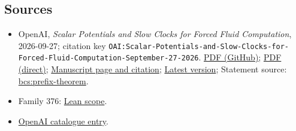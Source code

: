 \documentclass[11pt]{article}
\begin{document}
\subsection{Sources}
\begin{itemize}
\item OpenAI, \emph{Scalar Potentials and Slow Clocks for Forced Fluid Computation}, 2026-09-27; citation key \texttt{OAI:Scalar-Potentials-and-Slow-Clocks-for-Forced-Fluid-Computation-September-27-2026}. \href{https://github.com/openai/math/blob/adc7f1241b42e322a6451854ab7e4b4c146bf78a/preprints/Scalar-Potentials-and-Slow-Clocks-for-Forced-Fluid-Computation-September-27-2026/manuscript.pdf}{PDF (GitHub)}; \href{https://github.com/openai/math/raw/adc7f1241b42e322a6451854ab7e4b4c146bf78a/preprints/Scalar-Potentials-and-Slow-Clocks-for-Forced-Fluid-Computation-September-27-2026/manuscript.pdf}{PDF (direct)}; \href{https://github.com/openai/math/blob/adc7f1241b42e322a6451854ab7e4b4c146bf78a/preprints/Scalar-Potentials-and-Slow-Clocks-for-Forced-Fluid-Computation-September-27-2026/README.md}{Manuscript page and citation}; \href{https://github.com/openai/math/blob/main/preprints/Scalar-Potentials-and-Slow-Clocks-for-Forced-Fluid-Computation-September-27-2026/manuscript.pdf}{Latest version}; Statement source: \href{https://github.com/openai/math/blob/adc7f1241b42e322a6451854ab7e4b4c146bf78a/preprints/Scalar-Potentials-and-Slow-Clocks-for-Forced-Fluid-Computation-September-27-2026/build/bcs-prefix.tex\#L4}{bcs:prefix-theorem}.
\item Family 376: \href{https://github.com/openai/math/blob/adc7f1241b42e322a6451854ab7e4b4c146bf78a/lean/docs/376.md}{Lean scope}.
\item \href{https://github.com/openai/math/blob/adc7f1241b42e322a6451854ab7e4b4c146bf78a/CONTENTS.md}{OpenAI catalogue entry}.
\end{itemize}
\end{document}
